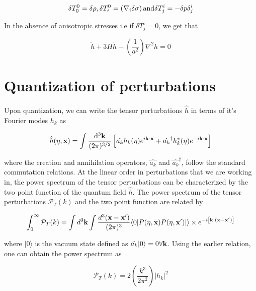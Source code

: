 \documentclass[12pt,a4paper,oneside]{book}
\begin{document}
\begin{equation}
\delta T^0_0 = \delta\rho, \delta T^0_i = \left(\nabla_i\delta\sigma\right)  {\rm and}  \delta T^i_j = -\delta p\delta^i_j
\end{equation}

\noindent In the absence of anisotropic stresses i.e if $\delta T^i_j = 0$, we get that

\begin{equation}\label{tp}
\ddot{h} + 3H\dot{h} - \left(\frac{1}{a^2}\right)\nabla ^2h = 0
\end{equation}

\section{Quantization of perturbations}

\paragraph*{} Upon quantization, we can write the tensor perturbations $\hat{h}$ in terms of it's Fourier modes $h_k$ as

\begin{equation}
\hat{h}(\eta, {\bf x}) = \int \frac{{\rm d}^3\bf{k}}{(2\pi)^{3/2}} \left[\hat{a_k}h_k(\eta)e^{i\bf{k\cdot x}}+ \hat{a_k}^{\dagger}h_k^{*}(\eta)e^{-i\bf{k\cdot x}}\right] 
\end{equation}

\noindent where the creation and annihilation operators, $\hat{a_k}$ and $\hat{a_k}^{\dagger}$, follow the standard commutation relations. At the linear order in perturbations that we are working in, the power spectrum of the tensor perturbations can be characterized by the two point function of the quantum field $\hat{h}$. The power spectrum of the tensor perturbations ${\mathcal{P}}_T(k)$ and the two point function are related by

\begin{equation}
\int^{\infty}_0 {\mathcal{P}}_T(k) = \int d^3{\bf{k}}\int\frac{d^3(\bf{x}-\bf{x'})}{(2\pi)^3}\langle 0|P(\eta,{\bf{x}})P(\eta, {\bf{x'}})|\rangle \times e^{-i{\bf{\left[k \cdot (x-x')\right]}}}
\end{equation}

\noindent where $|0\rangle$ is the vacuum state defined as $\hat{a_k}|0\rangle = 0 \forall {\bf{k}}$. Using the earlier relation, one can obtain the power spectrum as

\begin{equation}\label{eq:tps}
{\mathcal{P}}_T(k) = 2 \left(\frac{k^3}{2\pi^2}\right) |h_k|^2
\end{equation}
\end{document}
